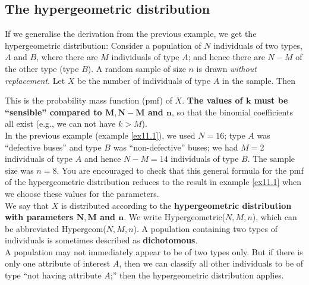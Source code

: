 \subsection{The hypergeometric distribution} \label{hypergeometric distribution}
If we generalise the derivation from the previous example, we get the hypergeometric distribution: Consider a population of $N$ individuals of two types, $A$ and $B$, where there are $M$ individuals of type $A$; and hence there are $N - M$ of the other type (type $B$). A random sample of size $n$ is drawn \textit{without replacement}. Let $X$ be the number of individuals of type $A$ in the sample. Then

  	\bigskip
	
	\hfil{}
	\bigskip
	\bigskip

\noindent This is the probability mass function (pmf) of $X$. \textbf{The values of $\boldsymbol{k}$ must be ``sensible'' compared to $\boldsymbol{M, N - M}$ and $\boldsymbol{n}$}, so that the binomial coefficients all exist (e.g., we can not have $k > M$). \\

\noindent In the previous example (example \ref{ex11.1}), we used $N = 16$; type $A$ was ``defective buses'' and type $B$ was ``non-defective'' buses; we had $M = 2$ individuals of type $A$ and hence $N - M = 14$ individuals of type $B$. The sample size was $n = 8$. You are encouraged to check that this general formula for the pmf of the hypergeometric distribution reduces to the result in example \ref{ex11.1} when we choose these values for the parameters. \\

\noindent We say that $X$ is distributed according to the \textbf{hypergeometric distribution with parameters $\boldsymbol{N, M}$ and $\boldsymbol{n}$}. We write Hypergeometric($N,M,n$), which can be abbreviated Hypergeom($N,M,n$). A population containing two types of individuals is sometimes described as \textbf{dichotomous}. \label{dichotomous} \\

\noindent A population may not immediately appear to be of two types only. But if there is only one attribute of interest $A$, then we can classify all other individuals to be of type ``not having attribute $A$;'' then the hypergeometric distribution applies.

